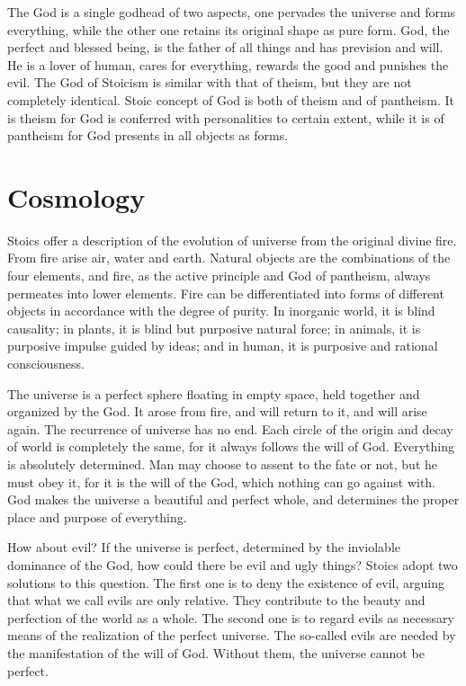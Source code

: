 \documentclass[11pt]{article}
\begin{document}
The God is a single godhead of two aspects, one pervades the universe and forms everything, while the other one retains its original shape as pure form. 
God, the perfect and blessed being, is the father of all things and has prevision and will. 
He is a lover of human, cares for everything, rewards the good and punishes the evil. 
The God of Stoicism is similar with that of theism, but they are not completely identical. 
Stoic concept of God is both of theism and of pantheism. 
It is theism for God is conferred with personalities to certain extent, while it is of pantheism for God presents in all objects as forms.

\section{Cosmology}
Stoics offer a description of the evolution of universe from the original divine fire. 
From fire arise air, water and earth. 
Natural objects are the combinations of the four elements, and fire, as the active principle and God of pantheism, always permeates into lower elements. 
Fire can be differentiated into forms of different objects in accordance with the degree of purity. 
In inorganic world, it is blind causality; 
in plants, it is blind but purposive natural force; 
in animals, it is purposive impulse guided by ideas; 
and in human, it is purposive and rational consciousness.

\newline

The universe is a perfect sphere floating in empty space, held together and organized by the God. 
It arose from fire, and will return to it, and will arise again. 
The recurrence of universe has no end. 
Each circle of the origin and decay of world is completely the same, for it always follows the will of God. 
Everything is absolutely determined. 
Man may choose to assent to the fate or not, but he must obey it, for it is the will of the God, which nothing can go against with. 
God makes the universe a beautiful and perfect whole, and determines the proper place and purpose of everything.

\newline

How about evil? 
If the universe is perfect, determined by the inviolable dominance of the God, how could there be evil and ugly things? 
Stoics adopt two solutions to this question. 
The first one is to deny the existence of evil, arguing that what we call evils are only relative. 
They contribute to the beauty and perfection of the world as a whole. 
The second one is to regard evils as necessary means of the realization of the perfect universe. 
The so-called evils are needed by the manifestation of the will of God. 
Without them, the universe cannot be perfect.
\end{document}
